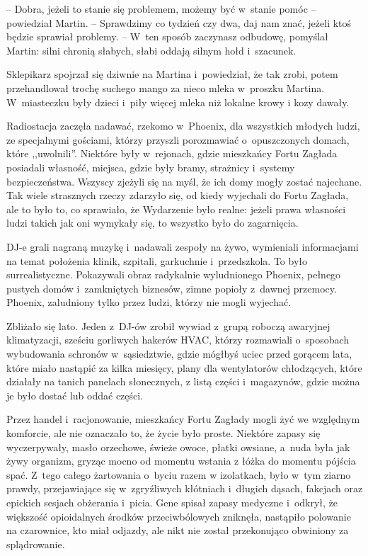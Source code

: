 \documentclass[oneside,polish,11pt,sfheadings]{mwbk}
\begin{document}
-- Dobra, jeżeli to stanie się problemem, możemy być w~stanie pomóc -- powiedział Martin. -- Sprawdzimy co tydzień czy dwa, daj nam znać, jeżeli
ktoś będzie sprawiał problemy. -- W~ten sposób zaczynasz odbudowę,
pomyślał Martin: silni chronią słabych, słabi oddają silnym hołd i~szacunek.

Sklepikarz spojrzał się dziwnie na Martina i~powiedział, że tak zrobi,
potem przehandlował trochę suchego mango za nieco mleka w~proszku
Martina. W~miasteczku były dzieci i~piły więcej mleka niż lokalne krowy
i kozy dawały.

Radiostacja zaczęła nadawać, rzekomo w~Phoenix, dla wszystkich młodych
ludzi, ze specjalnymi gościami, którzy przyszli porozmawiać o~opuszczonych domach, które ,,uwolnili''. Niektóre były w~rejonach, gdzie
mieszkańcy Fortu Zagłada posiadali własność, miejsca, gdzie były bramy,
strażnicy i~systemy bezpieczeństwa. Wszyscy zjeżyli się na myśl, że ich
domy mogły zostać najechane. Tak wiele strasznych rzeczy zdarzyło się,
od kiedy wyjechali do Fortu Zagłada, ale to było to, co sprawiało, że
Wydarzenie było realne: jeżeli prawa własności ludzi takich jak oni
wymykały się, to wszystko było do zagarnięcia.

DJ-e grali nagraną muzykę i~nadawali zespoły na żywo, wymieniali
informacjami na temat położenia klinik, szpitali, garkuchnie i~przedszkola. To było surrealistyczne. Pokazywali obraz radykalnie
wyludnionego Phoenix, pełnego pustych domów i~zamkniętych biznesów,
zimne popioły z~dawnej przemocy. Phoenix, zaludniony tylko przez ludzi,
którzy nie mogli wyjechać.

Zbliżało się lato. Jeden z~DJ-ów zrobił wywiad z~grupą roboczą awaryjnej
klimatyzacji, sześciu gorliwych hakerów HVAC, którzy rozmawiali o~sposobach wybudowania schronów w~sąsiedztwie, gdzie mógłbyś uciec przed
gorącem lata, które miało nastąpić za kilka miesięcy, plany dla
wentylatorów chłodzących, które działały na tanich panelach słonecznych,
z listą części i~magazynów, gdzie można je było dostać lub oddać części.

Przez handel i~racjonowanie, mieszkańcy Fortu Zagłady mogli żyć we
względnym komforcie, ale nie oznaczało to, że życie było proste.
Niektóre zapasy się wyczerpywały, masło orzechowe, świeże owoce, płatki
owsiane, a~nuda była jak żywy organizm, gryząc mocno od momentu wstania
z łóżka do momentu pójścia spać. Z~tego całego żartowania o~byciu razem
w izolatkach, było w~tym ziarno prawdy, przejawiające się w~zgryźliwych
kłótniach i~długich dąsach, fakcjach oraz epickich sesjach obżerania i~picia. Gene spisał zapasy medyczne i~odkrył, że większość opioidalnych
środków przeciwbólowych zniknęła, nastąpiło polowanie na czarownice, kto
miał odjazdy, ale nikt nie został przekonująco obwiniony za
splądrowanie.
\end{document}
